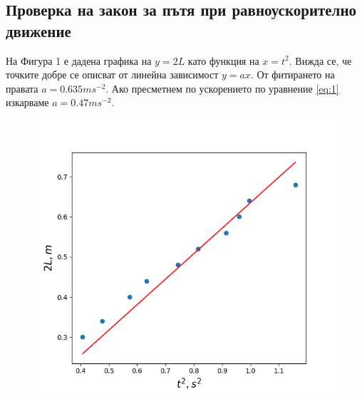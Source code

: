 \documentclass[aps, prb, twocolumn, a4paper, floatfix, reprint]{revtex4-2}
\begin{document}
\subsection{Проверка на закон за пътя при равноускорително движение}
На Фигура 1 е дадена графика на $y=2L$ като функция на $x=t^2$. Вижда се, че точките добре се описват от линейна зависимост $y=ax$. От фитирането на правата $a=0.635 ms^{-2}$. Ако пресметнем по ускорението по уравнение \eqref{eq:1} изкарваме $a=0.47 ms^{-2}$. 
\begin{figure}[H]
    \centering
    \includegraphics[width=\columnwidth, keepaspectratio=true]{Figure_1.png}
\end{figure}
\end{document}
